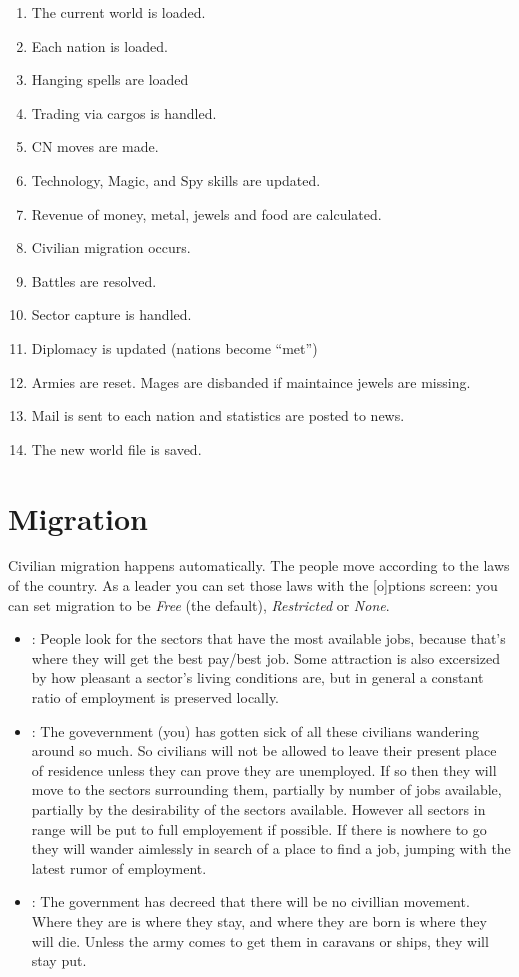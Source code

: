 \begin{enumerate}

\item The current world is loaded.
\item Each nation is loaded.
\item Hanging spells are loaded
\item Trading via cargos is handled.
\item CN moves are made.
\item Technology, Magic, and Spy skills are updated.
\item Revenue of money, metal, jewels and food are calculated.
\item Civilian migration occurs.
\item Battles are resolved.
\item Sector capture is handled.
\item Diplomacy is updated (nations become ``met'')
\item Armies are reset.  Mages are disbanded if maintaince jewels are missing.
\item Mail is sent to each nation and statistics are posted to news.
\item The new world file is saved.

\end{enumerate}

\section{Migration}
\label{sec-migration}

Civilian migration happens automatically.  The people move according to
the laws of the country.  As a leader you can set those laws with the
[o]ptions screen:  you can set migration to be {\em Free} (the default),
{\em Restricted} or {\em None}.

\begin{itemize}
\item
{}: People look for the sectors that have the most
available jobs, because that's where they will get the best pay/best
job.  Some attraction is also excersized by how pleasant a sector's
living conditions are, but in general a constant ratio of employment
is preserved locally.
\item
{}: The govevernment (you) has gotten sick of all these
civilians wandering around so much.  So civilians will not be allowed
to leave their present place of residence unless they can prove they
are unemployed.  If so then they will move to the sectors surrounding
them, partially by number of jobs available, partially by the
desirability of the sectors available.  However all sectors in range
will be put to full employement if possible.  If there is nowhere to
go they will wander aimlessly in search of a place to find a job,
jumping with the latest rumor of employment.
\item
{}: The government has decreed that there will be no
civillian movement.  Where they are is where they stay, and where they
are born is where they will die.  Unless the army comes to get them in
caravans or ships, they will stay put.
\end{itemize}

